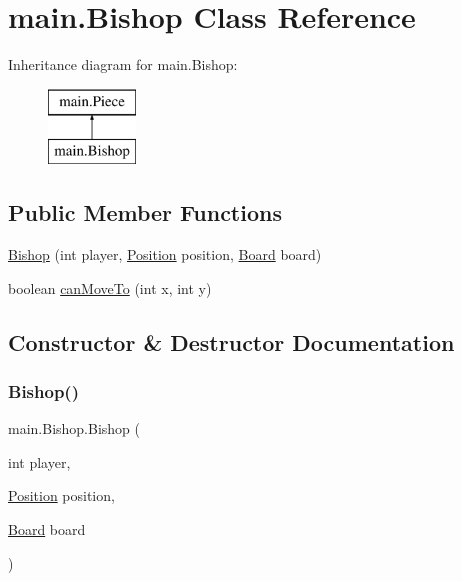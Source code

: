 \hypertarget{classmain_1_1_bishop}{}\section{main.\+Bishop Class Reference}
\label{classmain_1_1_bishop}
Inheritance diagram for main.\+Bishop\+:\begin{figure}[H]
\begin{center}
\leavevmode
\includegraphics[height=2.000000cm]{classmain_1_1_bishop}
\end{center}
\end{figure}
\subsection*{Public Member Functions}
\begin{DoxyCompactItemize}
\item 
\hyperlink{classmain_1_1_bishop_ae4a17c8ad184c8f0240c7c2c29f52b38}{Bishop} (int player, \hyperlink{classmain_1_1_position}{Position} position, \hyperlink{classmain_1_1_board}{Board} board)
\item 
boolean \hyperlink{classmain_1_1_bishop_ac7443304a05994dba25f2a53fe83e452}{can\+Move\+To} (int x, int y)
\end{DoxyCompactItemize}


\subsection{Constructor \& Destructor Documentation}
\mbox{\label{classmain_1_1_bishop_ae4a17c8ad184c8f0240c7c2c29f52b38}} 
\subsubsection{\texorpdfstring{Bishop()}{Bishop()}}
{\footnotesize\ttfamily main.\+Bishop.\+Bishop (\begin{DoxyParamCaption}\item[{int}]{player,  }\item[{\hyperlink{classmain_1_1_position}{Position}}]{position,  }\item[{\hyperlink{classmain_1_1_board}{Board}}]{board }\end{DoxyParamCaption})}

